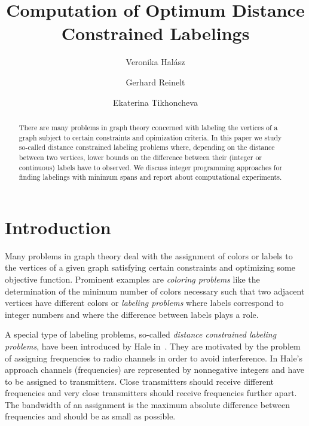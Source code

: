 \documentclass[smallextended]{svjour3}
\begin{document}
 
\title{Computation of Optimum Distance Constrained Labelings} 
\author{Veronika Hal\'asz \and Gerhard Reinelt \and Ekaterina Tikhoncheva} 

\date{\datum} 

\maketitle 

\begin{abstract} 
There are many problems in graph theory concerned with labeling the 
vertices of a graph subject to certain constraints and opimization criteria. In this 
paper we study so-called distance constrained labeling problems where, depending on 
the distance between two vertices, lower bounds on the difference 
between their (integer or continuous) labels have to observed. We discuss integer programming 
approaches for finding labelings with minimum spans and report about computational 
experiments. 
\end{abstract} 


% 
% 
% 
\section{Introduction} 
 
Many problems in graph theory deal with the assignment of colors or labels to the vertices 
of a given graph satisfying certain constraints and optimizing some objective function. 
Prominent examples are \emph{coloring problems} like the determination of the minimum 
number of colors necessary such that two adjacent vertices have different colors 
or \emph{labeling problems} where labels correspond to integer numbers and where 
the difference between labels plays a role. 

A special type of labeling problems, so-called 
\emph{distance constrained labeling problems}, have been introduced by Hale in~\cite{Hal80}. 
They are motivated by the problem of assigning frequencies to radio channels in order 
to avoid interference. In Hale's approach channels (frequencies) are 
represented by nonnegative integers and have to be assigned to transmitters. 
Close transmitters should receive different frequencies and very close 
transmitters should receive frequencies further apart. The bandwidth of an assignment 
is the maximum absolute difference between frequencies and should be as small 
as possible. 
\end{document}
